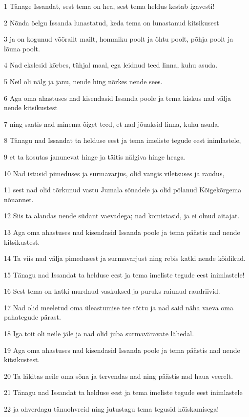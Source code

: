\par 1 Tänage Issandat, sest tema on hea, sest tema heldus kestab igavesti!
\par 2 Nõnda öelgu Issanda lunastatud, keda tema on lunastanud kitsikusest
\par 3 ja on kogunud võõrailt mailt, hommiku poolt ja õhtu poolt, põhja poolt ja lõuna poolt.
\par 4 Nad ekslesid kõrbes, tühjal maal, ega leidnud teed linna, kuhu asuda.
\par 5 Neil oli nälg ja janu, nende hing nõrkes nende sees.
\par 6 Aga oma ahastuses nad kisendasid Issanda poole ja tema kiskus nad välja nende kitsikustest
\par 7 ning saatis nad minema õiget teed, et nad jõuaksid linna, kuhu asuda.
\par 8 Tänagu nad Issandat ta helduse eest ja tema imeliste tegude eest inimlastele,
\par 9 et ta kosutas janunevat hinge ja täitis nälgiva hinge heaga.
\par 10 Nad istusid pimeduses ja surmavarjus, olid vangis viletsuses ja raudus,
\par 11 sest nad olid tõrkunud vastu Jumala sõnadele ja olid põlanud Kõigekõrgema nõuannet.
\par 12 Siis ta alandas nende südant vaevadega; nad komistasid, ja ei olnud aitajat.
\par 13 Aga oma ahastuses nad kisendasid Issanda poole ja tema päästis nad nende kitsikustest.
\par 14 Ta viis nad välja pimedusest ja surmavarjust ning rebis katki nende köidikud.
\par 15 Tänagu nad Issandat ta helduse eest ja tema imeliste tegude eest inimlastele!
\par 16 Sest tema on katki murdnud vaskuksed ja puruks raiunud raudriivid.
\par 17 Nad olid meeletud oma üleastumise tee tõttu ja nad said näha vaeva oma pahategude pärast.
\par 18 Iga toit oli neile jäle ja nad olid juba surmaväravate lähedal.
\par 19 Aga oma ahastuses nad kisendasid Issanda poole ja tema päästis nad nende kitsikustest.
\par 20 Ta läkitas neile oma sõna ja tervendas nad ning päästis nad haua veerelt.
\par 21 Tänagu nad Issandat ta helduse eest ja tema imeliste tegude eest inimlastele
\par 22 ja ohverdagu tänuohvreid ning jutustagu tema tegusid hõiskamisega!
